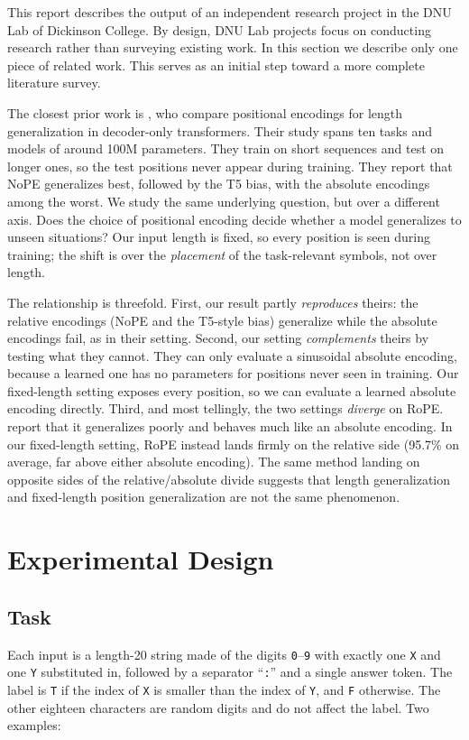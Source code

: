 \documentclass{article}
\begin{document}
This report describes the output of an independent research project in the DNU
Lab of Dickinson College. By design, DNU Lab projects focus on conducting
research rather than surveying existing work. In this section we describe only
one piece of related work. This serves as an initial step toward a more complete
literature survey.

The closest prior work is \citet{kazemnejad2023impact}, who compare positional
encodings for length generalization in decoder-only transformers. Their study
spans ten tasks and models of around 100M parameters. They train on
short sequences and test on longer ones, so the test positions never appear
during training. They report that NoPE generalizes best, followed by the T5 bias,
with the absolute encodings among the worst. We study the same underlying question, but over a different axis. Does the choice
of positional encoding decide whether a model generalizes to unseen situations? Our input
length is fixed, so every position is seen during training; the shift is over the
\emph{placement} of the task-relevant symbols, not over length.

The relationship is threefold. First, our result partly \emph{reproduces} theirs:
the relative encodings (NoPE and the T5-style bias) generalize while the absolute
encodings fail, as in their setting.
Second, our setting \emph{complements} theirs by testing what they cannot. They
can only evaluate a sinusoidal absolute encoding, because a learned one has no
parameters for positions never seen in training. Our fixed-length setting exposes
every position, so we can evaluate a learned absolute encoding directly. Third, and most tellingly, the two settings
\emph{diverge} on RoPE. \citet{kazemnejad2023impact} report that it generalizes
poorly and behaves much like an absolute encoding. In our fixed-length setting,
RoPE instead lands firmly on the relative side (95.7\% on average, far above
either absolute encoding). The same method landing on
opposite sides of the relative/absolute divide suggests that length generalization
and fixed-length position generalization are not the same phenomenon.

\section{Experimental Design}

\subsection{Task}
Each input is a length-20 string made of the digits \texttt{0}--\texttt{9} with
exactly one \texttt{X} and one \texttt{Y} substituted in, followed by a
separator ``\texttt{:}'' and a single answer token. The label is \texttt{T} if the
index of \texttt{X} is smaller than the index of \texttt{Y}, and \texttt{F}
otherwise. The other eighteen characters are random digits and do not affect the
label. Two examples:
\end{document}
